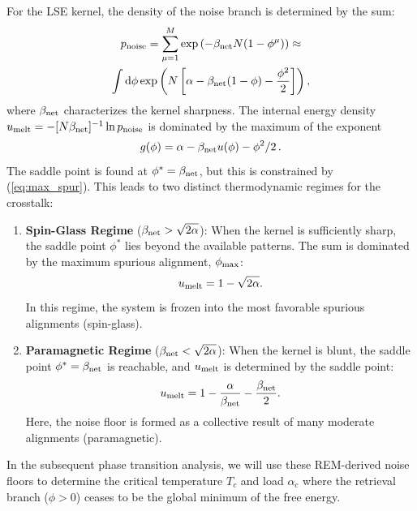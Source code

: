 \documentclass{article}
\newcommand{\dd}{{\mathrm{d}}}
\theoremstyle{plain}
\theoremstyle{definition}
\theoremstyle{remark}
\begin{document}
For the LSE kernel, the density of the noise branch is determined by the sum:
\begin{multline}
    p_{\rm noise} = \sum_{\mu=1}^{M} \exp\left( -\beta_{\rm net} N (1 - \phi^\mu) \right) \approx \\
    \int \dd\phi \exp\left( N \left[ \alpha - \beta_{\rm net}(1 - \phi) - \frac{\phi^2}{2} \right] \right),
\end{multline}
where $\beta_{\rm net}$ characterizes the kernel sharpness. The internal energy density $u_{\rm melt} = - [{N\beta_{\rm net}}]^{-1} \ln p_{\rm noise}$ is dominated by the maximum of the exponent 
\begin{equation}
    g(\phi) = \alpha - \beta_{\rm net} u(\phi) - \phi^2/2\,.
    \label{eq:g_phi}
\end{equation}
The saddle point is found at $\phi^* = \beta_{\rm net}$, but this is constrained by (\ref{eq:max_spur}). This leads to two distinct thermodynamic regimes for the crosstalk:

\begin{enumerate}
    \item \textbf{Spin-Glass Regime} ($\beta_{\rm net} > \sqrt{2\alpha}$): 
    When the kernel is sufficiently sharp, the saddle point $\phi^*$ lies beyond the available patterns. The sum is dominated by the maximum spurious alignment, $\phi_{\rm max}$:
    \begin{equation}
        u_{\rm melt} = 1 - \sqrt{2\alpha}.
    \end{equation}
    In this regime, the system is frozen into the most favorable spurious alignments (spin-glass).
    
    \item \textbf{Paramagnetic Regime} ($\beta_{\rm net} < \sqrt{2\alpha}$): 
    When the kernel is blunt, the saddle point $\phi^* = \beta_{\rm net}$ is reachable, and $u_{\rm melt}$ is determined by the saddle point:
    \begin{equation}
        u_{\rm melt} = 1 - \frac{\alpha}{\beta_{\rm net}} - \frac{\beta_{\rm net}}{2}.
    \end{equation}
    Here, the noise floor is formed as a collective result of many moderate alignments (paramagnetic).
\end{enumerate}

In the subsequent phase transition analysis, we will use these REM-derived noise floors to determine the critical temperature $T_c$ and load $\alpha_c$ where the retrieval branch ($\phi > 0$) ceases to be the global minimum of the free energy.
\end{document}

